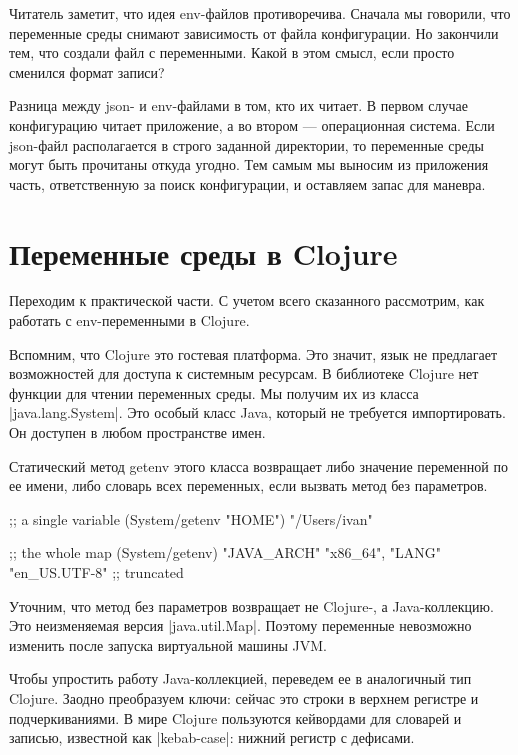 
Читатель заметит, что идея env-файлов противоречива. Сначала мы говорили, что
переменные среды снимают зависимость от файла конфигурации. Но закончили тем,
что создали файл с переменными. Какой в этом смысл, если просто сменился формат
записи?

Разница между json- и env-файлами в том, кто их читает. В первом случае
конфигурацию читает приложение, а во втором — операционная система. Если
json-файл располагается в строго заданной директории, то переменные среды могут
быть прочитаны откуда угодно. Тем самым мы выносим из приложения часть,
ответственную за поиск конфигурации, и оставляем запас для маневра.

\section{Переменные среды в Clojure}

Переходим к практической части. С учетом всего сказанного рассмотрим, как
работать с env-переменными в Clojure.

Вспомним, что Clojure это гостевая платформа. Это значит, язык не предлагает
возможностей для доступа к системным ресурсам. В библиотеке Clojure нет функции
для чтении переменных среды. Мы получим их из класса \spverb|java.lang.System|. Это
особый класс Java, который не требуется импортировать. Он доступен в любом
пространстве имен.

Статический метод getenv этого класса возвращает либо значение переменной по ее
имени, либо словарь всех переменных, если вызвать метод без параметров.

\begin{code}
;; a single variable
(System/getenv "HOME")
"/Users/ivan"

;; the whole map
(System/getenv)
{"JAVA_ARCH" "x86_64", "LANG" "en_US.UTF-8"} ;; truncated
\end{code}

Уточним, что метод без параметров возвращает не Clojure-, а Java-коллекцию. Это
неизменяемая версия \spverb|java.util.Map|. Поэтому переменные невозможно изменить
после запуска виртуальной машины JVM.

Чтобы упростить работу Java-коллекцией, переведем ее в аналогичный тип
Clojure. Заодно преобразуем ключи: сейчас это строки в верхнем регистре и
подчеркиваниями. В мире Clojure пользуются кейвордами для словарей и записью,
известной как \spverb|kebab-case|: нижний регистр с дефисами.

